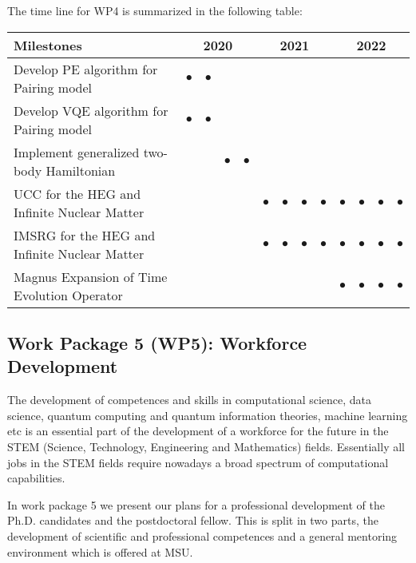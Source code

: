 \documentclass[11pt]{article}
\begin{document}
The time line for WP4 is summarized in the following table:
\begin{footnotesize}
\begin{center}
\begin{tabular}{|l|c|c|c|c|c|c|c|c|c|c|c|c|}
\hline
\multicolumn{1}{|l}{Milestones } & \multicolumn{4}{|c|}{ 2020 } & \multicolumn{4}{c|}{ 2021 } & \multicolumn{4}{c|}{ 2022 } \\
\hline
Develop PE algorithm for Pairing model &$\bullet$ &$\bullet$ && & & & & & & & &  \\
\hline
Develop VQE algorithm for Pairing model &$\bullet$  & $\bullet$ & & &  & & & & & & & \\
\hline
Implement generalized two-body Hamiltonian & & &$\bullet$  & $\bullet$ & & & & & & & &  \\

\hline
UCC for the HEG and Infinite Nuclear Matter & && & &$\bullet$  &$\bullet$ &$\bullet$  &$\bullet$  &$\bullet$  &$\bullet$ &$\bullet$  &$\bullet$   \\
\hline
IMSRG for the HEG and Infinite Nuclear Matter & && & &$\bullet$  &$\bullet$ &$\bullet$  &$\bullet$  &$\bullet$  &$\bullet$ &$\bullet$  &$\bullet$   \\
\hline
Magnus Expansion of Time Evolution Operator & && & &   &  &   &   &$\bullet$  &$\bullet$ &$\bullet$  &$\bullet$   \\
\hline

\end{tabular}
\end{center}
\end{footnotesize}

\subsection{Work Package 5 (WP5): Workforce Development}

The development of competences and skills in computational science, data science, quantum computing and quantum information theories, machine learning etc is an essential part of the development of a workforce for the future in the STEM (Science, Technology, Engineering and Mathematics) fields. Essentially all jobs in the STEM fields require nowadays a broad spectrum of computational capabilities. 

In work package 5 we present our plans for a professional development of the Ph.D. candidates and the postdoctoral fellow. This is split in two parts, the development of scientific and professional competences and a general mentoring environment which is offered at MSU. 
\end{document}
